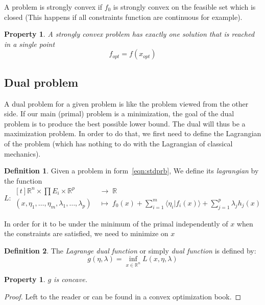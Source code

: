 \documentclass[10pt,a4paper]{report}
\theoremstyle{plain}
\newtheorem{prop}[thm]{Property}
\theoremstyle{definition}
\newtheorem{defn}{Definition}[chapter]
\theoremstyle{remark}
\newcommand{\R}{\ensuremath{\mathbb{R}}}
\newcommand{\TODO}{\textbf{TODO}}
\newcommand{\braket}[2]{\langle#1|#2\rangle}
\begin{document}
A problem is strongly convex if $f_0$ is strongly convex on the feasible set
which is closed (This happens if all constraints function are continuous for example).

\begin{prop}
  A strongly convex problem has exactly one solution that is reached in a single point
  \[f_{opt} = f(x_{opt})\]
\end{prop}

\subsection{Dual problem}

A dual problem for a given problem is like the problem viewed from the other
side. If our main (primal) problem is a minimization, the goal of the dual
problem is to produce the best possible lower bound. The dual will thus be a
maximization problem. In order to do that, we first
need to define the Lagrangian of the problem (which has nothing to do with the
Lagrangian of classical mechanics).

\begin{defn}
  Given a problem in form~\ref{eqn:stdprb}, We define its \emph{lagrangian} by
  the function
  \[ L:\begin{aligned}[t] \R^n \times \prod E_i \times \R^p \;&\to\; \R\\
      (x,\eta_1,\ldots,\eta_m,\lambda_1,\ldots,\lambda_p) \;&\mapsto\; f_0(x) +
      \sum_{i = 1}^m \braket {\eta_i}{f_i(x)} + \sum_{j = 1}^p \lambda_j h_j(x)
    \end{aligned}
  \]
\end{defn}


In order for it to be under the minimum of the primal independently of $x$ when the constraints are
satisfied, we need to minimize on $x$

\begin{defn}
  The \emph{Lagrange dual function} or simply \emph{dual function} is defined by:
  \[g(\eta,\lambda) = \inf_{x \in \R^n} L(x,\eta,\lambda)\]
\end{defn}

\begin{prop}
  $g$ is concave.
\end{prop}

\begin{proof}
  Left to the reader or can be found in a convex optimization book.
\end{proof}
\end{document}
